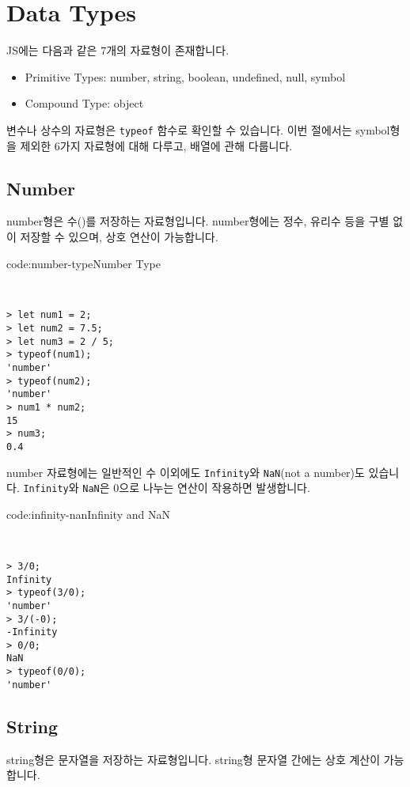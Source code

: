\section{Data Types} \label{sect:data-types}

JS에는 다음과 같은 7개의 자료형이 존재합니다. 

\begin{itemize}
    \item Primitive Types: number, string, boolean, undefined, null, symbol
    \item Compound Type: object
\end{itemize}

변수나 상수의 자료형은 \verb|typeof| 함수로 확인할 수 있습니다. 이번 절에서는 symbol형을 제외한 6가지 자료형에 대해 다루고, 배열에 관해 다룹니다. 

\subsection*{Number}

number형은 수()를 저장하는 자료형입니다. number형에는 정수, 유리수 등을 구별 없이 저장할 수 있으며, 상호 연산이 가능합니다.

\begin{codeenv}{code:number-type}{Number Type}\begin{verbatim}


> let num1 = 2;
> let num2 = 7.5;
> let num3 = 2 / 5;
> typeof(num1);
'number'
> typeof(num2);
'number'
> num1 * num2;
15
> num3;
0.4
\end{verbatim}
\end{codeenv}

number 자료형에는 일반적인 수 이외에도 \verb|Infinity|와 \verb|NaN|(not a number)도 있습니다. \verb|Infinity|와 \verb|NaN|은 0으로 나누는 연산이 작용하면 발생합니다. 

\begin{codeenv}{code:infinity-nan}{Infinity and NaN}\begin{verbatim}


> 3/0;
Infinity
> typeof(3/0);
'number'
> 3/(-0);
-Infinity
> 0/0;
NaN
> typeof(0/0);
'number'
\end{verbatim}
\end{codeenv}

\subsection*{String}

string형은 문자열을 저장하는 자료형입니다. string형 문자열 간에는 상호 계산이 가능합니다.

